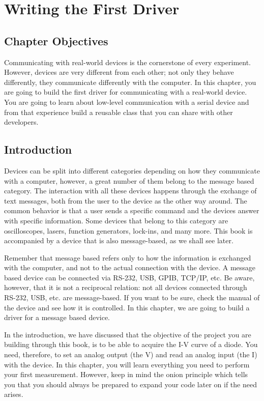 \chapter{Writing the First Driver}
\section{Chapter Objectives}
Communicating with real-world devices is the cornerstone of every
experiment. However, devices are very different from each other; not
only they behave differently, they communicate differently with the
computer. In this chapter, you are going to build the first driver for
communicating with a real-world device. You are going to learn about
low-level communication with a serial device and from that experience
build a reusable class that you can share with other developers.

\section{Introduction}
Devices can be split into different categories depending on how they
communicate with a computer, however, a great number of them belong to
the message based category. The interaction with all these devices
happens through the exchange of text messages, both from the user to the
device as the other way around. The common behavior is that a user sends
a specific command and the devices answer with specific information.
Some devices that belong to this category are oscilloscopes, lasers,
function generators, lock-ins, and many more. This book is accompanied
by a device that is also message-based, as we shall see later.

Remember that message based refers only to how the information is
exchanged with the computer, and not to the actual connection with the
device. A message based device can be connected via RS-232, USB,
GPIB, TCP/IP, etc. Be aware, however, that it is not a reciprocal
relation: not all devices connected through RS-232, USB, etc. are
message-based. If you want to be sure, check the manual of the device
and see how it is controlled. In this chapter, we are going to build a
driver for a message based device.

In the introduction, we have discussed that the objective of the project
you are building through this book, is to be able to acquire the I-V
curve of a diode. You need, therefore, to set an analog output (the V)
and read an analog input (the I) with the device. In this chapter, you
will learn everything you need to perform your first measurement.
However, keep in mind the onion principle which tells you that you
should always be prepared to expand your code later on if the
need arises.

